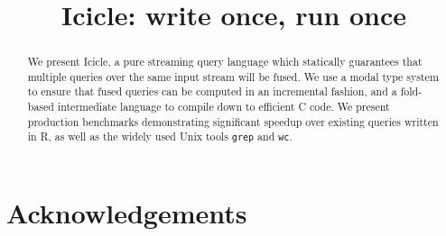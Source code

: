 \documentclass[preprint]{sigplanconf}
\begin{document}
\doi{}

\title{Icicle: write once, run once}


\maketitle
\makeatactive

\begin{abstract}
We present Icicle, a pure streaming query language which statically guarantees that multiple queries over the same input stream will be fused. We use a modal type system to ensure that fused queries can be computed in an incremental fashion, and a fold-based intermediate language to compile down to efficient C code. We present production benchmarks demonstrating significant speedup over existing queries written in R, as well as the widely used Unix tools \texttt{grep} and \texttt{wc}.

\end{abstract}







% 


\section*{Acknowledgements}



\end{document}
